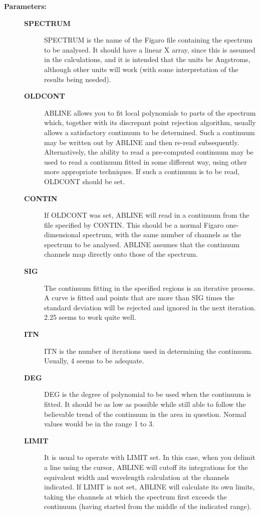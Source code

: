 \begin{description}
\item [{\bf Parameters:}]
\begin{description}
\item [{\bf SPECTRUM}]
 SPECTRUM is the name of the Figaro file containing the spectrum to be
 analysed.  It should have a linear X array, since this is assumed in
 the calculations, and it is intended that the units be Angstroms,
 although other units will work (with some interpretation of the
 results being needed).
\item [{\bf OLDCONT}]
 ABLINE allows you to fit local polynomials to parts of the spectrum
 which, together with its discrepant point rejection algorithm,
 usually allows a satisfactory continuum to be determined.  Such a
 continuum may be written out by ABLINE and then re-read subsequently.
 Alternatively, the ability to read a pre-computed continuum may be
 used to read a continuum fitted in some different way, using other
 more appropriate techniques.  If such a continuum is to be read,
 OLDCONT should be set.
\item [{\bf CONTIN}]
 If OLDCONT was set, ABLINE will read in a continuum from the
 file specified by CONTIN.  This should be a normal Figaro
 one-dimensional spectrum, with the same number of channels as the
 spectrum to be analysed.  ABLINE assumes that the continuum channels
 map directly onto those of the spectrum.
\item [{\bf SIG}]
 The continuum fitting in the specified regions is an iterative
 process.  A curve is fitted and points that are more than SIG times
 the standard deviation will be rejected and ignored in the next
 iteration.  2.25 seems to work quite well.
\item [{\bf ITN}]
 ITN is the number of iterations used in determining the continuum.
 Usually, 4 seems to be adequate.
\item [{\bf DEG}]
 DEG is the degree of polynomial to be used when the continuum is
 fitted.  It should be as low as possible while still able to follow
 the believable trend of the continuum in the area in question.
 Normal values would be in the range 1 to 3.
\item [{\bf LIMIT}]
 It is usual to operate with LIMIT set.  In this case, when you
 delimit a line using the cursor, ABLINE will cutoff its integrations
 for the equivalent width and wavelength calculation at the channels
 indicated.  If LIMIT is not set, ABLINE will calculate its own
 limits, taking the channels at which the spectrum first exceeds the
 continuum (having started from the middle of the indicated range).

\end{description}
\end{description}

